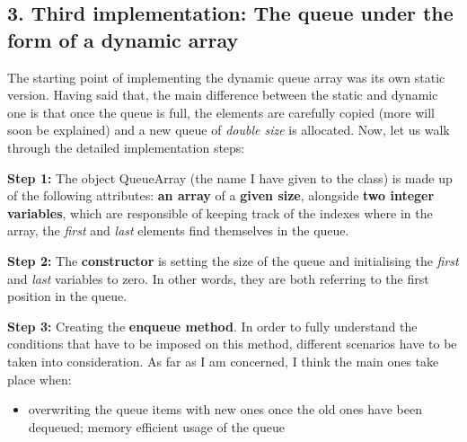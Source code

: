 \documentclass[a4paper,11pt]{article}
\begin{document}
\subsection*{3. Third implementation: The queue under the form of a dynamic array}
The starting point of implementing the dynamic queue array was its own static version. Having said that, the main difference between the static and dynamic one is that once the queue is full, the elements are carefully copied (more will soon be explained) and a new queue of \textit{double size} is allocated. Now, let us walk through the detailed implementation steps:\newline

\textbf{Step 1:} The object QueueArray (the name I have given to the class) is made up of the following attributes: \textbf{an array} of a \textbf{given size}, alongside \textbf{two integer variables}, which are responsible of keeping track of the indexes where in the array, the \textit{first} and \textit{last} elements find themselves in the queue. \newline

\textbf{Step 2:} The \textbf{constructor} is setting the size of the queue and initialising the \textit{first} and \textit{last} variables to zero. In other words, they are both referring to the first position in the queue.\newline

\textbf{Step 3:} Creating the \textbf{enqueue method}.
In order to fully understand the conditions that have to be imposed on this method, different scenarios have to be taken into consideration. As far as I am concerned, I think the main ones take place when:
\begin{itemize}
\item overwriting the queue items with new ones once the old ones have been dequeued; memory efficient usage of the queue
\end{itemize}
\end{document}
